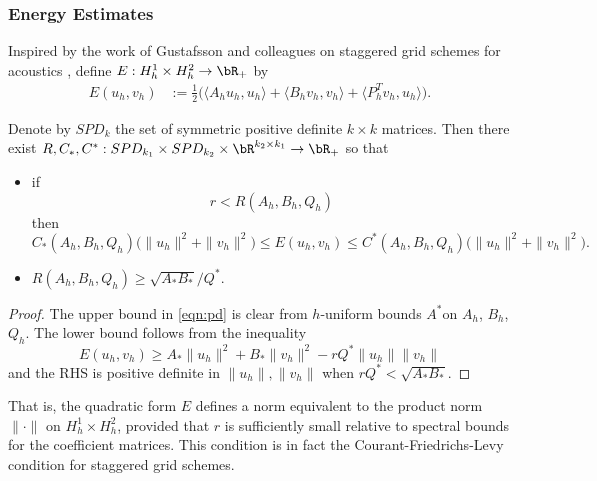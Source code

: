 \subsubsection{Energy Estimates}

Inspired by the work of Gustafsson and colleagues on staggered grid
schemes for acoustics \cite[]{GusWahl:04a,GusWahl:04b,GusMoss:04},
define $E: H^1_h \times H^2_h \rightarrow \bR_+$ by
\begin{equation*}
\begin{split}
	E(u_h,v_h) &:= \frac{1}{2} \Big( \langle A_h u_h,u_h\rangle + 
				       \langle B_hv_h,v_h\rangle +
				       \langle P^T_h v_h,u_h\rangle \Big).
\end{split}
\end{equation*}

\begin{theorem}
Denote by $SPD_k$ the set of symmetric positive definite $k\times k$
matrices. Then there exist $R, C_*, C^*: SPD_{k_1} \times SPD_{k_2} \times
\bR^{k_2\times k_1} \rightarrow \bR_+$ so that 
\begin{itemize}
\item if
\begin{equation}
\label{eq:cfl}
r < R(A_h,B_h,Q_h)
\end{equation}
then
\begin{equation}
\label{eqn:pd}
	C_*(A_h,B_h,Q_h) \Big( \|u_h\|^2 + \|v_h\|^2 \Big) \le E(u_h,v_h) \le C^*(A_h,B_h,Q_h)\Big( \|u_h\|^2 +\|v_h\|^2 \Big).
\end{equation}
\item $R(A_h,B_h,Q_h) \ge \sqrt{A_*B_*}/Q^*$.
\end{itemize}
\end{theorem}

\begin{proof}
The upper bound in \ref{eqn:pd} is clear from $h$-uniform bounds $A^*$on $A_h$, $B_h$, 
$Q_h$. 
The lower bound follows from the inequality
\[
	E(u_h,v_h) \ge A_*\|u_h\|^2 + B_*\|v_h\|^2 - rQ^*\|u_h\|\|v_h\|
\]
and the RHS is positive definite in $\|u_h\|,\|v_h\|$ when $rQ^* <\sqrt{A_*B_*}$. 
\end{proof}

That is,  the quadratic form $E$ defines a norm equivalent to the
product norm $\|\cdot\|$ on $H^1_h \times H^2_h$, provided that $r$
is sufficiently small relative to spectral bounds for the coefficient
matrices. This condition is in fact the Courant-Friedrichs-Levy
condition for staggered grid schemes.

